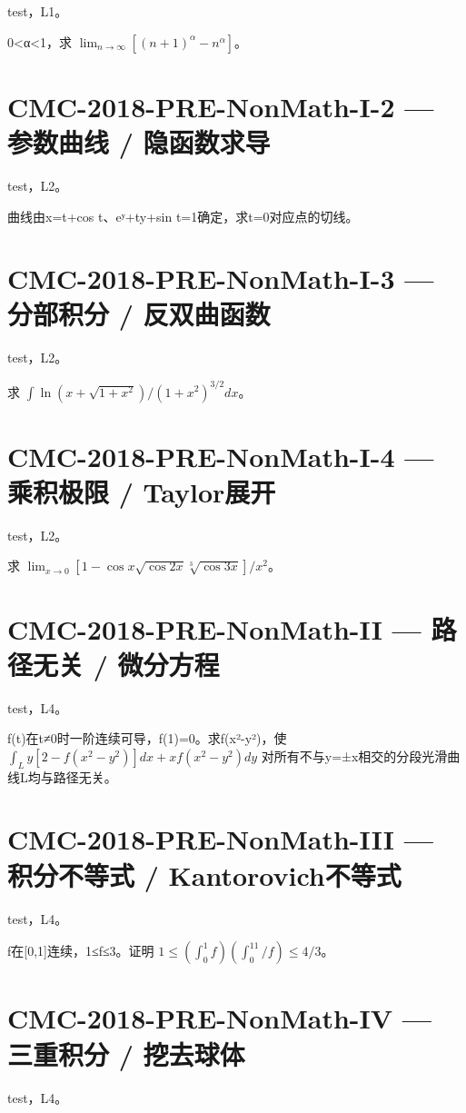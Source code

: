 \documentclass[UTF8]{ctexart}
\begin{document}
test，L1。

0<α<1，求 $\lim_{n\to\infty}[(n+1)^\alpha-n^\alpha]$。

\section*{CMC-2018-PRE-NonMath-I-2 — 参数曲线 / 隐函数求导}

test，L2。

曲线由x=t+cos t、eʸ+ty+sin t=1确定，求t=0对应点的切线。

\section*{CMC-2018-PRE-NonMath-I-3 — 分部积分 / 反双曲函数}

test，L2。

求 $\int\ln(x+\sqrt{1+x^2})/(1+x^2)^{3/2}dx$。

\section*{CMC-2018-PRE-NonMath-I-4 — 乘积极限 / Taylor展开}

test，L2。

求 $\lim_{x\to0}[1-\cos x\sqrt{\cos2x}\sqrt[3]{\cos3x}]/x^2$。

\section*{CMC-2018-PRE-NonMath-II — 路径无关 / 微分方程}

test，L4。

f(t)在t≠0时一阶连续可导，f(1)=0。求f(x²-y²)，使 $\int_L y[2-f(x^2-y^2)]dx+xf(x^2-y^2)dy$ 对所有不与y=±x相交的分段光滑曲线L均与路径无关。

\section*{CMC-2018-PRE-NonMath-III — 积分不等式 / Kantorovich不等式}

test，L4。

f在[0,1]连续，1≤f≤3。证明 $1\le(\int_0^1f)(\int_0^11/f)\le4/3$。

\section*{CMC-2018-PRE-NonMath-IV — 三重积分 / 挖去球体}

test，L4。
\end{document}
